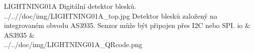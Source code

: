 \uvod
{LIGHTNING01A}
{Digitální detektor blesků.}
{}
{../..//doc/img/LIGHTNING01A_top.jpg}
{Detektor blesků založený na integrovaném obvodu AS3935. Senzor může být připojen přes I2C nebo SPI.}
{			io
		 & AS3935  & \\ \hline  }
{../../doc/img/LIGHTNING01A_QRcode.png}